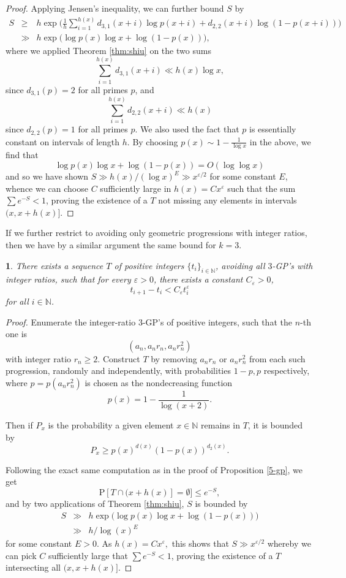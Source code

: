 \documentclass[12pt,english,BCOR7.5mm]{amsart}
\numberwithin{equation}{section}
\numberwithin{figure}{section}
\theoremstyle{definition}
\theoremstyle{plain}
\theoremstyle{plain}
\theoremstyle{plain}
\theoremstyle{definition}
\theoremstyle{plain}
\newtheorem{prop}[thm]{\protect\propositionname}
\theoremstyle{plain}
\providecommand{\propositionname}{Proposition}
\begin{document}
\begin{proof}
Applying Jensen's inequality, we can further bound $S$ by
\begin{eqnarray*}
S & \geq & h\exp\Big(\frac{1}{h}\sum_{i=1}^{h(x)}d_{3,1}(x+i)\log p(x+i)+d_{2,2}(x+i)\log(1-p(x+i))\Big)\\
 & \gg & h\exp\Big(\log p(x)\log x+\log(1-p(x))\Big),
\end{eqnarray*}
where we applied Theorem \ref{thm:shiu} on the two sums
\[
\sum_{i=1}^{h(x)}d_{3,1}(x+i)\ll h(x)\log x,
\]
since $d_{3,1}(p)=2$ for all primes $p$, and
\[
\sum_{i=1}^{h(x)}d_{2,2}(x+i)\ll h(x)
\]
since $d_{2,2}(p)=1$ for all primes $p$. We also used the fact that
$p$ is essentially constant on intervals of length $h$. By choosing
$p(x)\sim1-\frac{1}{\log x}$ in the above, we find that
\[
\log p(x)\log x+\log(1-p(x))=O(\log\log x)
\]
and so we have shown $S\gg h(x)/(\log x)^{E}\gg x^{\varepsilon/2}$
for some constant $E$, whence we can choose $C$ sufficiently large
in $h(x)=Cx^{\varepsilon}$ such that the sum $\sum e^{-S}<1$, proving
the existence of a $T$ not missing any elements in intervals $(x,x+h(x)]$.
\end{proof}
If we further restrict to avoiding only geometric progressions with
integer ratios, then we have by a similar argument the same bound
for $k=3$.
\begin{prop}
There exists a sequence $T$ of positive integers $\{t_{i}\}_{i\in\mathbb{N}}$,
avoiding all $3$-GP's with integer ratios, such that for every $\varepsilon>0$,
there exists a constant $C_{\varepsilon}>0$,
\[
t_{i+1}-t_{i}<C_{\varepsilon}t_{i}^{\varepsilon}
\]
for all $i\in\mathbb{N}$.\end{prop}
\begin{proof}
Enumerate the integer-ratio $3$-GP's of positive integers, such that
the $n$-th one is
\[
(a_{n},a_{n}r_{n},a_{n}r_{n}^{2})
\]
with integer ratio $r_{n}\geq2$. Construct $T$ by removing $a_{n}r_{n}$
or $a_{n}r_{n}^{2}$ from each such progression, randomly and independently,
with probabilities $1-p,p$ respectively, where $p=p(a_{n}r_{n}^{2})$
is chosen as the nondecreasing function 
\[
p(x)=1-\frac{1}{\log(x+2)}.
\]

Then if $P_{x}$ is the probability a given element $x\in\mathbb{N}$
remains in $T$, it is bounded by
\[
P_{x}\geq p(x)^{d(x)}(1-p(x))^{d_{2}(x)}.
\]

Following the exact same computation as in the proof of Proposition
\ref{5-gp}, we get
\[
\mbox{P}[T\cap(x+h(x)]=\emptyset]\leq e^{-S},
\]
and by two applications of Theorem \ref{thm:shiu}, $S$ is bounded
by
\begin{eqnarray*}
S & \gg & h\exp\Big(\log p(x)\log x+\log(1-p(x))\Big)\\
 & \gg & h/\log(x)^{E}
\end{eqnarray*}
for some constant $E>0$. As $h(x)=Cx^{\varepsilon},$ this shows
that $S\gg x^{\varepsilon/2}$ whereby we can pick $C$ sufficiently
large that $\sum e^{-S}<1$, proving the existence of a $T$ intersecting
all $(x,x+h(x)]$.
\end{proof}
\end{document}
